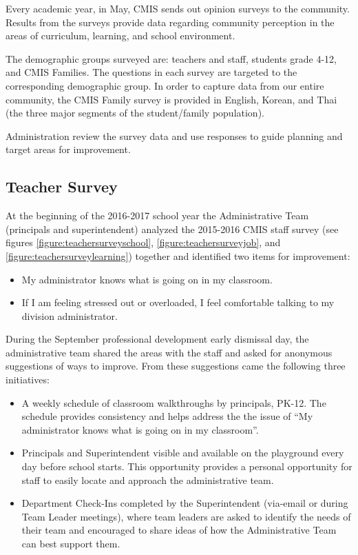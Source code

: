 
Every academic year, in May, CMIS sends out opinion surveys to the community.  Results from the surveys provide data regarding community perception in the areas of curriculum, learning, and school environment. 

The demographic groups surveyed are: teachers and staff, students grade 4-12, and CMIS Families. The questions in each survey are targeted to the corresponding demographic group. In order to capture data from our entire community, the CMIS Family survey is provided in English, Korean, and Thai (the three major segments of the student/family population).

Administration review the survey data and use responses to guide planning and target areas for improvement.

\subsection{Teacher Survey}

At the beginning of the 2016-2017 school year the Administrative Team (principals and superintendent) analyzed the 2015-2016 CMIS staff survey (see figures \ref{figure:teachersurveyschool}, \ref{figure:teachersurveyjob}, and \ref{figure:teachersurveylearning}) together and identified two items for improvement:
\begin{itemize}
\item My administrator knows what is going on in my classroom.
\item If I am feeling stressed out or overloaded, I feel comfortable talking to my division administrator. 
\end{itemize}


During the September professional development early dismissal day, the administrative team shared the areas with the staff and asked for anonymous suggestions of ways to improve. From these suggestions came the following three initiatives:
\begin{itemize}
\item A weekly schedule of classroom walkthroughs by principals, PK-12.  The schedule provides consistency and helps address the the issue of “My administrator knows what is going on in my classroom”.
\item Principals and Superintendent visible and available on the playground every day before school starts.  This opportunity provides a personal opportunity for staff to easily locate and approach the administrative team.
\item Department Check-Ins completed by the Superintendent (via-email or during Team Leader meetings), where team leaders are asked to identify the needs of their team and encouraged to share ideas of how the Administrative Team can best support them.
\end{itemize}

